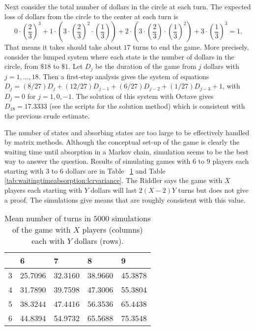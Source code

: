 \documentclass[12pt]{article}
\begin{document}
\begin{example}
    Next consider the total number of dollars in the circle at each
    turn.  The expected loss of dollars from the circle to the center at
    each turn is
    \[
        0 \cdot \left( \frac{2}{3} \right)^3 + 1 \cdot \left( 3 \cdot
        \left( \frac{2}{3} \right)^2 \cdot \left( \frac{1}{3} \right)
        \right) + 2 \cdot \left( 3 \cdot \left( \frac{2}{3} \right)
        \cdot \left( \frac{1}{3} \right)^2 \right) + 3 \cdot \left(
        \frac {1}{3} \right)^3 = 1.
    \] That means it takes should take about \( 17 \) turns to end the
    game.  More precisely, consider the lumped system where each state
    is the number of dollars in the circle, from \( \$18 \) to \( \$1 \).
    Let \( D_j \) be the duration of the game from \( j \) dollars with \(
    j = 1, \dots, 18 \).  Then a first-step analysis gives the system of
    equations \( D_j = (8/27)D_j + (12/27)D_{j-1} + (6/27)D_{j-2} + (1/27)D_
    {j-3} + 1 \), with \( D_j = 0 \) for \( j = 1, 0, -1 \).  The
    solution of this system with Octave gives \( D_{18} = 17.3333 \) (see
    the scripts for the solution method) which is consistent with the
    previous crude estimate.

    The number of states and absorbing states are too large to be
    effectively handled by matrix methods.  Although the conceptual
    set-up of the game is clearly the waiting time until absorption in a
    Markov chain, simulation seems to be the best way to answer the
    question.  Results of simulating games with \( 6 \) to \( 9 \)
    players each starting with \( 3 \) to \( 6 \) dollars are in Table~%
    \ref{tab:waitingtimeabsorption:lcrmean} and Table~%
    \ref{tab:waitingtimeabsorption:lcrvariance}. The Riddler says the game
    with \( X \) players each starting with \( Y \) dollars will last \(
    2(X-2)Y \) turns but does not give a proof.  The simulations give
    means that are roughly consistent with this value.
    \begin{table}
        \centering
        \begin{tabular}{l | llll}
                   & 6       & 7       & 8       & 9       \\ 
            \hline
            3      & 25.7096 & 32.3160 & 38.9660 & 45.3878 \\ 
            4      & 31.7890 & 39.7598 & 47.3006 & 55.3804 \\ 
            5      & 38.3244 & 47.4416 & 56.3536 & 65.4438 \\ 
            6      & 44.8394 & 54.9732 & 65.5688 & 75.3548
        \end{tabular}
        \caption{Mean number of turns in $ 5000 $ simulations of the
        game with $ X $ players (columns) each with $ Y $ dollars (rows).}
        \label{tab:waitingtimeabsorption:lcrmean}
    \end{table}


\end{example}
\end{document}
